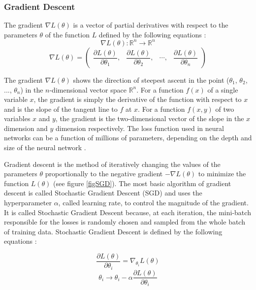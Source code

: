 \documentclass[a4paper, twoside]{article}
\newcommand*{\pd}[2]{\ensuremath{\dfrac{\partial #1}{\partial #2}}}
\begin{document}
\subsubsection{Gradient Descent}
The gradient $\nabla L(\theta)$ is a vector of partial derivatives with respect to the parameters $\theta$ of the function $L$ defined by the following equations \cite{gradient} \cite{convmath}:
\begin{equation}\label{EQgradientspace}
\nabla L(\theta) : \mathbb{R}^n \to \mathbb{R}^n
\end{equation}
\begin{equation}\label{EQgradientvector}
\nabla L(\theta) = 
	\begin{pmatrix} 
		\pd{L(\theta)}{\theta_{1}}, & 
		\pd{L(\theta)}{\theta_{2}}, &
		\cdots, &
		\pd{L(\theta)}{\theta_{n}}
		
		\end{pmatrix}
\end{equation}

The gradient $\nabla L(\theta)$ shows the direction of steepest ascent in the point ($\theta_{1}$, $\theta_{2}$, ..., $\theta_{n}$) in the $n$-dimensional vector space $\mathbb{R}^{n}$. For a function $f(x)$ of a single variable $x$, the gradient is simply the derivative of the function with respect to $x$ and is the slope of the tangent line to $f$ at $x$. For a function $f(x,y)$ of two variables $x$ and $y$, the gradient is the two-dimensional vector of the slope in the $x$ dimension and $y$ dimension respectively. The loss function used in neural networks can be a function of millions of parameters, depending on the depth and size of the neural network \cite{gradient} \cite{convmath}.

Gradient descent is the method of iteratively changing the values of the parameters $\theta$ proportionally to the negative gradient $-\nabla L(\theta)$ to minimize the function $L(\theta)$ (see figure \ref{figSGD}). The most basic algorithm of gradient descent is called Stochastic Gradient Descent (SGD) and uses the hyperparameter $\alpha$, called learning rate, to control the magnitude of the gradient. It is called Stochastic Gradient Descent because, at each iteration, the mini-batch responsible for the losses is randomly chosen and sampled from the whole batch of training data. Stochastic Gradient Descent is defined by the following equations \cite{wikiStanford} \cite{gradient} \cite{convmath}:

\begin{equation}\label{EQgradient}
\pd{L(\theta)}{\theta_i} = \nabla_{\theta_i} L(\theta)
\end{equation}
\begin{equation}\label{SGD}
{\theta_i} \to {\theta_i} - \alpha \pd{L(\theta)}{\theta_i}
\end{equation}
\end{document}
